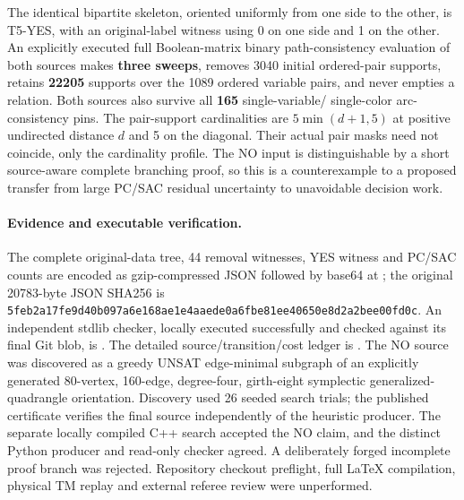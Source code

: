 \documentclass[11pt]{article}
\begin{document}
The identical bipartite skeleton, oriented uniformly from
one side to the other, is T5-YES, with an original-label witness
using 0 on one side and 1 on the other. An explicitly executed
full Boolean-matrix binary path-consistency evaluation of both
sources makes \textbf{three sweeps}, removes 3040 initial
ordered-pair supports, retains \textbf{22205} supports over
the 1089 ordered variable pairs, and never empties a relation.
Both sources also survive all \textbf{165} single-variable/
single-color arc-consistency pins. The pair-support cardinalities
are $5\min(d+1,5)$ at positive undirected distance $d$ and
5 on the diagonal. Their actual pair masks need not coincide,
only the cardinality profile. The NO input is distinguishable
by a short source-aware complete branching proof, so this
is a counterexample to a proposed transfer from large
PC/SAC residual uncertainty to unavoidable decision work.

\paragraph{Evidence and executable verification.}
The complete original-data tree, 44 removal witnesses,
YES witness and PC/SAC counts are encoded as gzip-compressed
JSON followed by base64 at
;
the original 20783-byte JSON SHA256 is
\texttt{5feb2a17fe9d40b097a6e168ae1e4aaede0a6fbe81ee40650e8d2a2bee00fd0c}.
An independent stdlib checker, locally executed successfully
and checked against its final Git blob, is
.
The detailed source/transition/cost ledger is
.
The NO source was discovered as a greedy UNSAT edge-minimal
subgraph of an explicitly generated 80-vertex, 160-edge,
degree-four, girth-eight symplectic generalized-quadrangle
orientation. Discovery used 26 seeded search trials; the
published certificate verifies the final source independently
of the heuristic producer. The separate locally compiled C++
search accepted the NO claim, and the distinct Python producer
and read-only checker agreed. A deliberately forged incomplete
proof branch was rejected. Repository checkout preflight, full
LaTeX compilation, physical TM replay and external referee
review were unperformed.
\end{document}
